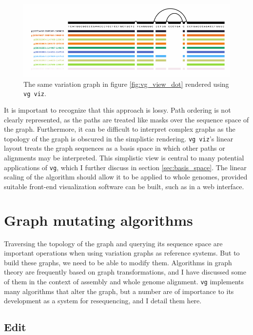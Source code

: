 \begin{figure}[htbp!] 
\centering    
\includegraphics[width=1.0\textwidth]{Chapter2/Figs/Vector/vg_viz_H-3136.pdf}
\caption{The same variation graph in figure \ref{fig:vg_view_dot} rendered using {\tt vg viz}.}
\label{fig:vg_viz}
\end{figure}

It is important to recognize that this approach is lossy.
Path ordering is not clearly represented, as the paths are treated like masks over the sequence space of the graph.
Furthermore, it can be difficult to interpret complex graphs as the topology of the graph is obscured in the simplistic rendering.
{\tt vg viz}'s linear layout treats the graph sequences as a basis space in which other paths or alignments may be interpreted.
This simplistic view is central to many potential applications of {\tt vg}, which I further discuss in section \ref{sec:basis_space}.
The linear scaling of the algorithm should allow it to be applied to whole genomes, provided suitable front-end visualization software can be built, such as in a web interface.

\section{Graph mutating algorithms}

Traversing the topology of the graph and querying its sequence space are important operations when using variation graphs as reference systems.
But to build these graphs, we need to be able to modify them.
Algorithms in graph theory are frequently based on graph transformations, and I have discussed some of them in the context of assembly and whole genome alignment.
{\tt vg} implements many algorithms that alter the graph, but a number are of importance to its development as a system for resequencing, and I detail them here.

\subsection{Edit}

